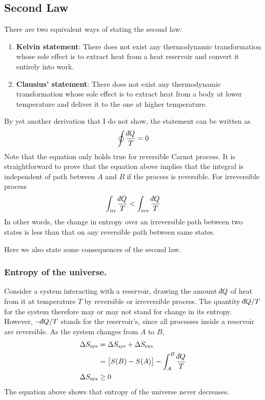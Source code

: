 \documentclass[../../../Main.tex]{subfiles}
\begin{document}
\subsection{Second Law}
There are two equivalent ways of stating the second law:
\begin{enumerate}
    \item \textbf{Kelvin statement}: There does not exist any thermodynamic transformation whose sole effect is to extract heat from a heat reservoir and convert it entirely into work.
    \item \textbf{Clausius' statement}: There does not exist any thermodynamic transformation whose sole effect is to extract heat from a body at lower temperature and deliver it to the one at higher temperature.
\end{enumerate}

By yet another derivation that I do not show, the statement can be written as 
\begin{equation*}
    \oint\frac{\dbar Q}{T}=0
\end{equation*}
Note that the equation only holds true for reversible Carnot process. It is straightforward to prove that the equation above implies that the integral is independent of path between $A$ and $B$ if the process is reversible. For irreversible process
\begin{equation*}
    \int_{\text{irr}}\frac{\dbar Q}{T}<\int_{\text{rev}}\frac{\dbar Q}{T}
\end{equation*}
In other words, the change in entropy over an irreversible path between two states is less than that on any reversible path between same states.

Here we also state some consequences of the second law.

\subsubsection{Entropy of the universe.} Consider a system interacting with a reservoir, drawing the amount $\dbar Q$ of heat from it at temperature $T$ by reversible or irreversible process. The quantity $\dbar Q/T$ for the system therefore may or may not stand for change in its entropy. However, $-\dbar Q /T$ stands for the reservoir's, since all processes inside a reservoir are reversible. As the system changes from $A$ to $B$,
\begin{align*}
    \Delta S_{\text{sys}} &=\Delta S_{\text{sys}}+\Delta S_{\text{env}}\\
    &=\big[S(B)-S{(A)}\big]-\int_A^B\frac{\dbar Q}{T}\\
    \Delta S_{\text{sys}} &\geq0
\end{align*}
The equation above shows that entropy of the universe never decreases.
\end{document}
